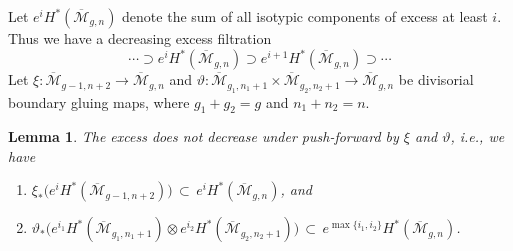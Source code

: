\documentclass[12pt]{amsart}
\newtheorem{lem}[thm]{Lemma}
\theoremstyle{definition}
\numberwithin{equation}{section}
\newcommand{\M}{\mathcal{M}}
\newcommand{\Mb}{\overline{\M}}
\theoremstyle{definition} %
\theoremstyle{remark}
\begin{document}
Let $e^iH^*(\Mb_{g,n})$ denote the sum of all isotypic components of excess at least $i$.  Thus we have a decreasing excess filtration
\[
\cdots \supset e^{i} H^*(\Mb_{g,n}) \supset e^{i+1} H^*(\Mb_{g,n}) \supset \cdots 
\]
Let $\xi\colon \Mb_{g-1,n+2}\rightarrow \Mb_{g,n}$ and $\vartheta\colon \Mb_{g_1,n_1+1}\times \Mb_{g_2,n_2+1}\rightarrow \Mb_{g,n}$ be divisorial boundary gluing maps, where $g_1+g_2=g$ and $n_1+n_2=n$. 

\begin{lem} \label{lem:boundaryexcess}
The excess does not decrease under push-forward by $\xi$ and $\vartheta$, i.e., we have
\begin{enumerate}
\item  $\xi_* \big(e^iH^*(\Mb_{g-1,n+2})\big) \, \subset \, e^i H^*(\Mb_{g,n})$, and \label{item:exc1}
\item  $\vartheta_* \big(e^{i_1} H^* (\Mb_{g_1,n_1+1}) \otimes e^{i_2} H^* (\Mb_{g_2, n_2 + 1})\big) \, \subset \, e^{\max\{i_1,i_2\}}H^*(\Mb_{g,n})$. \label{item:exc2}
\end{enumerate}
\end{lem}
\end{document}
